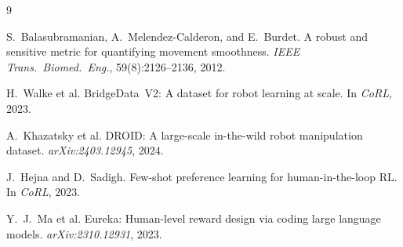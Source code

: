 \documentclass[10pt,twocolumn]{article}
\begin{document}

\begin{thebibliography}{9}

S.~Balasubramanian, A.~Melendez-Calderon, and E.~Burdet.
\newblock A robust and sensitive metric for quantifying movement smoothness.
\newblock \emph{IEEE Trans.\ Biomed.\ Eng.}, 59(8):2126--2136, 2012.

H.~Walke et al.
\newblock BridgeData~V2: A dataset for robot learning at scale.
\newblock In \emph{CoRL}, 2023.

A.~Khazatsky et al.
\newblock DROID: A large-scale in-the-wild robot manipulation dataset.
\newblock \emph{arXiv:2403.12945}, 2024.

J.~Hejna and D.~Sadigh.
\newblock Few-shot preference learning for human-in-the-loop RL.
\newblock In \emph{CoRL}, 2023.

Y.~J.~Ma et al.
\newblock Eureka: Human-level reward design via coding large language models.
\newblock \emph{arXiv:2310.12931}, 2023.

\end{thebibliography}
\end{document}
